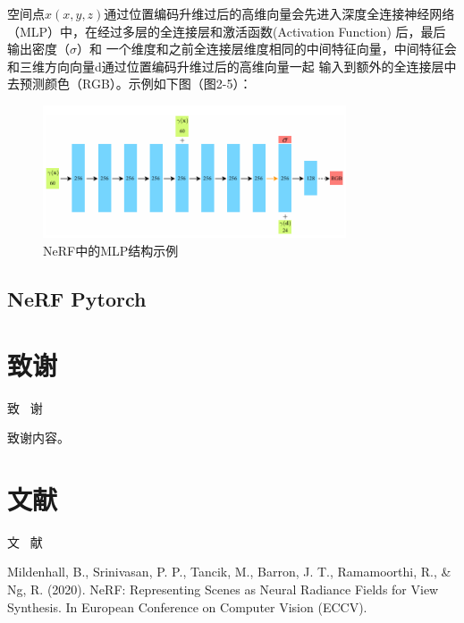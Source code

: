 \documentclass{nwputhesis}
\begin{document}
\indent
空间点$x(x,y,z)$通过位置编码升维过后的高维向量会先进入深度全连接神经网络（MLP）中，在经过多层的全连接层和激活函数(Activation Function)
后，最后输出密度（$\sigma$）和 一个维度和之前全连接层维度相同的中间特征向量，中间特征会和三维方向向量d通过位置编码升维过后的高维向量一起
输入到额外的全连接层中去预测颜色（RGB）。示例如下图（图2-5）：
\hypertarget{图2-5}{}
\begin{figure}[H]
    \centering
    \includegraphics[width=0.8\textwidth]{picture/5.png}
    \caption{NeRF中的MLP结构示例}
\end{figure}
\makespace
\hypertarget{section 2.3}{}
\subsection{NeRF Pytorch}
\makespace
\section*{致谢}
\begin{center}
    { \blackti \fontsize{16.0600pt}{1.25}致 \, 谢}
\end{center}
致谢内容。

\makespace
\section*{文献}
\begin{center}
    { \blackti \fontsize{16.0600pt}{1.25}文 \, 献}
\end{center}
\noindent
Mildenhall, B., Srinivasan, P. P., Tancik, M., Barron, J. T., Ramamoorthi, R., \& Ng, R. (2020). NeRF: 
Representing Scenes as Neural Radiance Fields for View Synthesis. In European Conference on Computer Vision 
(ECCV).\\
\end{document}
